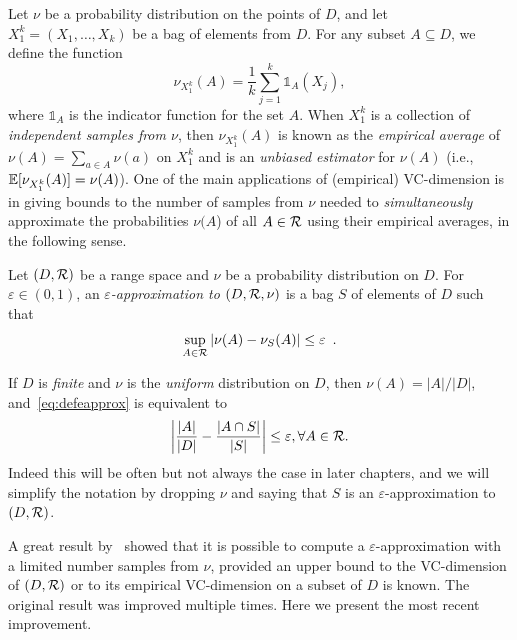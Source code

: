 Let $\nu$ be a probability distribution on the points of $D$, and let
$X_1^k=(X_1,\dotsc,X_k)$ be a bag of elements from $D$. For any subset
$A\subseteq D$, we define the function 
\[
\nu_{X_1^k}(A)=\frac{1}{k}\sum_{j=1}^k\mathds{1}_A(X_j),\]
where $\mathds{1}_A$ is the indicator function for the set $A$. When $X_1^k$ is
a collection of \emph{independent samples from $\nu$}, then $\nu_{X_1^k}(A)$ is known as the
\emph{empirical average} of $\nu(A)=\sum_{a\in A}\nu(a)$ on $X_1^k$ and is an
\emph{unbiased estimator} for $\nu(A)$ (i.e.,
$\mathbb{E}[\nu_{X_1^k}(A)]=\nu(A)$). One of the main applications of
(empirical) VC-dimension is in giving bounds to the number of samples from $\nu$
needed to \emph{simultaneously} approximate the probabilities $\nu(A$) of all
$A\in\mathcal{R}$ using their empirical averages, in the following sense.

\begin{definition}\label{def:eapprox}
  Let $(D,\mathcal{R})$ be a range space and $\nu$ be a probability distribution on
  $D$. For $\varepsilon\in(0,1)$, an \emph{$\varepsilon$-approximation to
  $(D,\mathcal{R},\nu)$} is a bag $S$ of elements of $D$ such that 
  \begin{equation}\label{eq:defeapprox}
  \sup_{A\in\mathcal{R}}|\nu(A)-\nu_S(A)|\le\varepsilon\enspace.
\end{equation}
\end{definition}

If $D$ is \emph{finite} and $\nu$ is the \emph{uniform} distribution on $D$, then
$\nu(A)=|A|/|D|$, and~\eqref{eq:defeapprox} is equivalent to
\[
\left|\frac{|A|}{|D|}-\frac{|A\cap S|}{|S|}\right|\le\varepsilon, \forall
A\in\mathcal{R}.
\]
Indeed this will be often but not always the case in later chapters, and we will
simplify the notation by dropping $\nu$ and saying that $S$ is an
$\varepsilon$-approximation to $(D,\mathcal{R})$.

A great result by~\citet{VapnikC71} showed that it is possible
to compute a $\varepsilon$-approximation with a limited number samples from
$\nu$, provided an upper bound to the VC-dimension of $(D,\mathcal{R})$ or to its
empirical VC-dimension on a subset of $D$ is known. The original result was
improved multiple times.  Here we present the most recent improvement.

